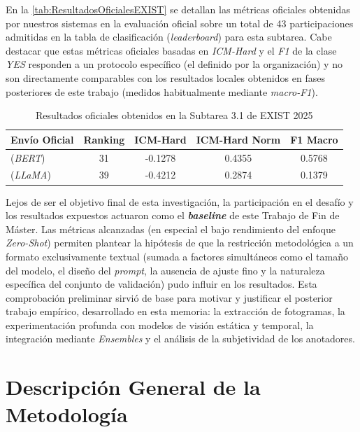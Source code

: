 En la \autoref{tab:ResultadosOficialesEXIST} se detallan las métricas oficiales obtenidas por nuestros sistemas en la evaluación oficial sobre un total de 43 participaciones admitidas en la tabla de clasificación (\textit{leaderboard}) para esta subtarea. Cabe destacar que estas métricas oficiales basadas en \textit{ICM-Hard} y el \textit{F1} de la clase \textit{YES} responden a un protocolo específico (el definido por la organización) y no son directamente comparables con los resultados locales obtenidos en fases posteriores de este trabajo (medidos habitualmente mediante \textit{macro-F1}).

\begin{table}[H]
    \centering
    \begin{tabular}{lcccc}
        \toprule
        \textbf{Envío Oficial} & \textbf{Ranking} & \textbf{ICM-Hard} & \textbf{ICM-Hard Norm} & \textbf{F1 Macro} \\
        \midrule
        (\textit{BERT}) & 31 & -0.1278 & 0.4355 & 0.5768 \\
        (\textit{LLaMA}) & 39 & -0.4212 & 0.2874 & 0.1379 \\
        \bottomrule
    \end{tabular}
    \caption{Resultados oficiales obtenidos en la Subtarea 3.1 de EXIST 2025}
    \label{tab:ResultadosOficialesEXIST}
\end{table}

Lejos de ser el objetivo final de esta investigación, la participación en el desafío y los resultados expuestos actuaron como el \textbf{\textit{baseline}} de este Trabajo de Fin de Máster. Las métricas alcanzadas (en especial el bajo rendimiento del enfoque \textit{Zero-Shot}) permiten plantear la hipótesis de que la restricción metodológica a un formato exclusivamente textual (sumada a factores simultáneos como el tamaño del modelo, el diseño del \textit{prompt}, la ausencia de ajuste fino y la naturaleza específica del conjunto de validación) pudo influir en los resultados. Esta comprobación preliminar sirvió de base para motivar y justificar el posterior trabajo empírico, desarrollado en esta memoria: la extracción de fotogramas, la experimentación profunda con modelos de visión estática y temporal, la integración mediante \textit{Ensembles} y el análisis de la subjetividad de los anotadores.

\section{Descripción General de la Metodología}
\label{sec:Metodologia}

